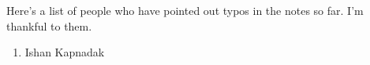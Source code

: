 Here's a list of people who have pointed out typos in the notes so far. I'm thankful to them.
\begin{enumerate}
	\item Ishan Kapnadak
\end{enumerate}